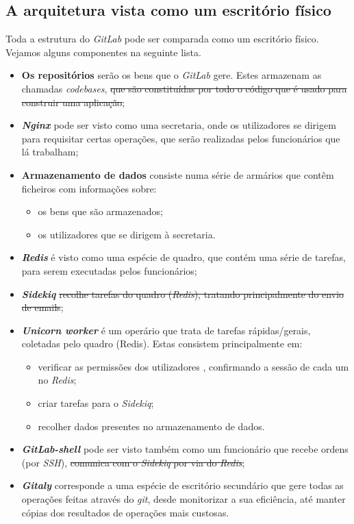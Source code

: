 \documentclass[12pt,a4paper]{article}
\begin{document}
\newpage
\subsection{A arquitetura vista como um escritório físico}

Toda a estrutura do \emph{GitLab} pode ser comparada como um escritório físico. Vejamos alguns componentes na seguinte lista.

\begin{itemize}
    \item \textbf{Os repositórios} serão os bens que o \emph{GitLab} gere. Estes armazenam as chamadas \textit{codebases}, \sout{que são constituídas por todo o código que é usado para construir uma aplicação};
    \item \textbf{\emph{Nginx}} pode ser visto como uma secretaria, onde os utilizadores se dirigem para requisitar certas operações, que serão realizadas pelos funcionários que lá trabalham;
    \item \textbf{Armazenamento de dados} consiste numa série de armários que contêm ficheiros com informações sobre:
    \begin{itemize}
        \item os bens que são armazenados;
        \item os utilizadores que se dirigem à secretaria.
    \end{itemize}
    \item \textbf{\emph{Redis}} é visto como uma espécie de quadro, que contém uma série de tarefas, para serem executadas pelos funcionários;
    \item \textbf{\emph{Sidekiq}} \sout{recolhe tarefas do quadro (\emph{Redis}), tratando principalmente do envio de emails};
    \item \textbf{\emph{Unicorn worker}} é um operário que trata de tarefas rápidas/gerais, coletadas pelo quadro (Redis). Estas consistem principalmente em:
    \begin{itemize}
        \item verificar as permissões dos utilizadores , confirmando a sessão de cada um no \emph{Redis};
        \item criar tarefas para o \emph{Sidekiq};
        \item recolher dados presentes no armazenamento de dados.
    \end{itemize}
    \item \textbf{\emph{GitLab-shell}} pode ser visto também como um funcionário que recebe ordens (por \emph{SSH}), \sout{comunica com o \emph{Sidekiq} por via do \emph{Redis}};
    \item \textbf{\emph{Gitaly}} corresponde a uma espécie de escritório secundário que gere todas as operações feitas através do \emph{git}, desde monitorizar a sua eficiência, até manter cópias dos resultados de operações mais custosas.
\end{itemize}
\end{document}
